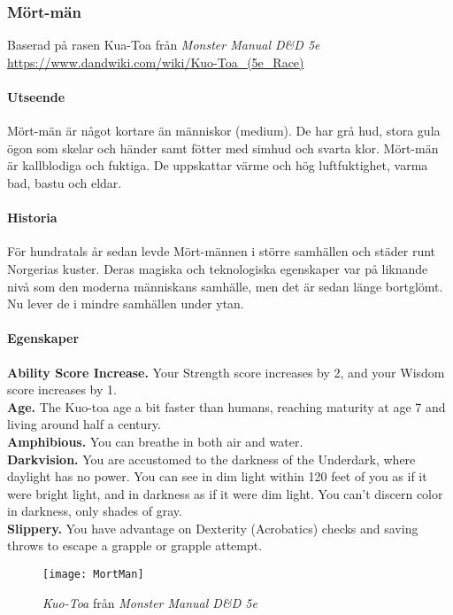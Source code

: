 \subsubsection{Mört-män}
\label{mortman}
Baserad på rasen Kua-Toa från \textit{Monster Manual D\&D 5e\cite{MonsterManual}} \\
\url{https://www.dandwiki.com/wiki/Kuo-Toa_(5e_Race)}
%
\paragraph{Utseende}
Mört-män är något kortare än människor (medium). De har grå hud, stora gula ögon som skelar och händer samt fötter med simhud och svarta klor. Mört-män är kallblodiga och fuktiga. De uppskattar värme och hög luftfuktighet, varma bad, bastu och eldar.
%
\paragraph{Historia}
För hundratals år sedan levde Mört-männen i större samhällen och städer runt Norgerias kuster. Deras magiska och teknologiska egenskaper var på liknande nivå som den moderna människans samhälle, men det är sedan länge bortglömt. Nu lever de i mindre samhällen under ytan.
%
\paragraph{Egenskaper}
\textbf{Ability Score Increase.} Your Strength score increases by 2, and your Wisdom score increases by 1. \\
\textbf{Age.} The Kuo-toa age a bit faster than humans, reaching maturity at age 7 and living around half a century. \\
\textbf{Amphibious.} You can breathe in both air and water. \\
\textbf{Darkvision.} You are accustomed to the darkness of the Underdark, where daylight has no power. You can see in dim light within 120 feet of you as if it were bright light, and in darkness 
as if it were dim light. You can't discern color in darkness, only shades of gray. \\
\textbf{Slippery.} You have advantage on Dexterity (Acrobatics) checks and saving throws to escape a grapple or grapple attempt. \\

\begin{figure}
	\centering
	\texttt{[image: MortMan]}
	\caption{\textit{Kuo-Toa} från \textit{Monster Manual D\&D 5e}\cite{MonsterManual}}
\end{figure}
